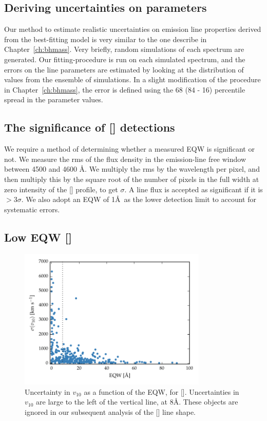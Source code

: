 \subsection{Deriving uncertainties on parameters}

Our method to estimate realistic uncertainties on emission line properties derived from the best-fitting model is very similar to the one describe in Chapter~\ref{ch:bhmass}. 
Very briefly, random simulations of each spectrum are generated.
Our fitting-procedure is run on each simulated spectrum, and the errors on the line parameters are estimated by looking at the distribution of values from the ensemble of simulations. 
In a slight modification of the procedure in Chapter~\ref{ch:bhmass}, the error is defined using the 68 (84 - 16) percentile spread in the parameter values. 

\subsection{The significance of [] detections}

We require a method of determining whether a measured EQW is significant or not. 
We measure the rms of the flux density in the emission-line free window between 4500 and 4600 \AA. 
We multiply the rms by the wavelength per pixel, and then multiply this by the square root of the number of pixels in the full width at zero intensity of the [] profile, to get $\sigma$. 
A line flux is accepted as significant if it is $>3\sigma$. 
We also adopt an EQW of 1\AA\, as the lower detection limit to account for systematic errors. 

\subsection{Low EQW []}

\begin{figure}
    \centering
    \includegraphics[width=0.8\textwidth]{figures/chapter04/eqw_cut.pdf} 
    \caption[{Uncertainty in $v_{10}$ as a function of the EQW, for [].}]{Uncertainty in $v_{10}$ as a function of the EQW, for []. Uncertainties in $v_{10}$ are large to the left of the vertical line, at 8\AA. These objects are ignored in our subsequent analysis of the [] line shape.}     
    \label{fig:eqw_cut}
\end{figure}

